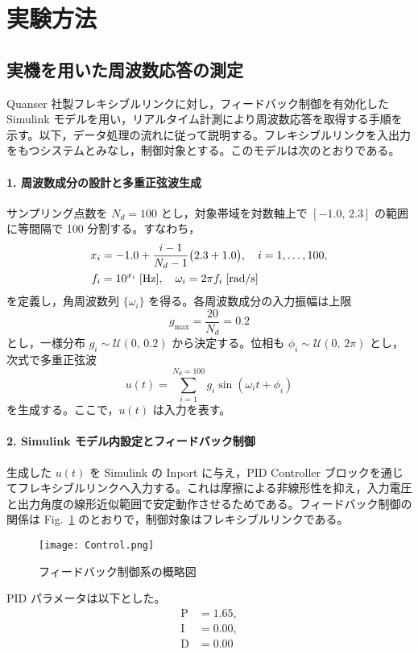 \section{実験方法}
\label{sec:section}

\subsection{実機を用いた周波数応答の測定}
\label{sec:apparatus}

Quanser 社製フレキシブルリンクに対し，フィードバック制御を有効化した Simulink モデルを用い，リアルタイム計測により周波数応答を取得する手順を示す。以下，データ処理の流れに従って説明する。フレキシブルリンクを入出力をもつシステムとみなし，制御対象とする。このモデルは次のとおりである。

\paragraph{1. 周波数成分の設計と多重正弦波生成}
サンプリング点数を
\(
  N_d = 100
\)
とし，対象帯域を対数軸上で \([-1.0,\,2.3]\) の範囲に等間隔で 100 分割する。すなわち，
{\small
\begin{align}
  x_i &= -1.0 + \frac{i-1}{N_d - 1}\bigl(2.3 + 1.0\bigr), \quad i = 1,\dots,100, \notag\\
  f_i &= 10^{x_i}\;[\mathrm{Hz}], 
  \quad
  \omega_i = 2\pi f_i\;[\mathrm{rad/s}] \notag
\end{align}
}
を定義し，角周波数列 \(\{\omega_i\}\) を得る。各周波数成分の入力振幅は上限
{\small
\[
  g_{\max} = \frac{20}{N_d} = 0.2
\]
}
とし，一様分布
\(
  g_i \sim \mathcal{U}(0,\,0.2)
\)
から決定する。位相も
\(
  \phi_i \sim \mathcal{U}(0,\,2\pi)
\)
とし，次式で多重正弦波
{\small
\begin{equation}
        \label{eq:multi_sine}
  u(t) = \sum_{i=1}^{N_d=100} g_i \sin(\omega_i t + \phi_i)
\end{equation}
}
を生成する。ここで，\(u(t)\) は入力を表す。

\paragraph{2. Simulink モデル内設定とフィードバック制御}
生成した \(u(t)\) を Simulink の Inport に与え，PID Controller ブロックを通じてフレキシブルリンクへ入力する。これは摩擦による非線形性を抑え，入力電圧と出力角度の線形近似範囲で安定動作させるためである。フィードバック制御の関係は Fig.~\ref{fig:feedback_control} のとおりで，制御対象はフレキシブルリンクである。
\begin{figure}[h]
  \centering
  \texttt{[image: Control.png]}
  \caption{フィードバック制御系の概略図}
  \label{fig:feedback_control}
\end{figure}
PID パラメータは以下とした。
{\small
\begin{align*}
  \mathrm{P} &= 1.65, \\
  \mathrm{I} &= 0.00, \\
  \mathrm{D} &= 0.00
\end{align*}
}

